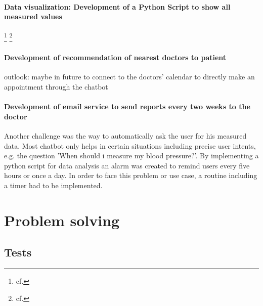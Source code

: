 \paragraph{Data visualization: Development of a Python Script to show all measured values} 
\footnote{cf.\autocite{kaggle}}
\footnote{cf.\autocite{decision_tree_python}}


\paragraph{Development of recommendation of nearest doctors to patient}
outlook: maybe in future to connect to the doctors' calendar to directly make an appointment through the chatbot

\paragraph{Development of email service to send reports every two weeks to the doctor}

Another challenge was the way to automatically ask the user for his measured data. Most chatbot only helps in certain situations including precise user intents, e.g. the question 'When should i measure my blood pressure?'. By implementing a python script for data analysis an alarm was created to remind users every five hours or once a day.
In order to face this problem or use case, a routine including a timer had to be implemented.


\section{Problem solving}
\subsection{Tests}
